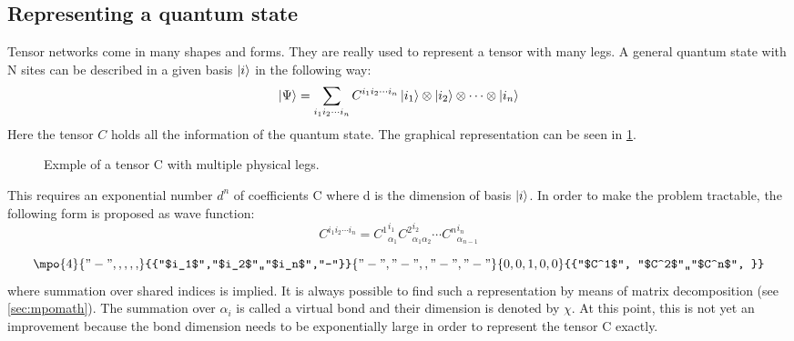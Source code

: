 \subsection{Representing a quantum state}

Tensor networks come in many shapes and forms. They are really used to represent a tensor with many legs. A general quantum state with N sites can be described in a given basis $\ket{i}$ in the following way:
\begin{equation}
    \ket{\Psi} = \sum_{i_1 i_2 \cdots i_n } C^{i_1 i_2 \cdots i_n} \ket{i_1} \otimes \ket{i_2} \otimes \cdots \otimes \ket{i_n}
\end{equation}
Here the tensor $C$ holds all the information of the quantum state. The graphical representation can be seen in \cref{fig:tens:intro:C}.
\begin{figure}[H]
    \centering


    \caption{Exmple of a tensor C with multiple physical legs.}
    \label{fig:tens:intro:C}
\end{figure}

This requires an exponential number $d^n$ of coefficients C where d is the dimension of basis $\ket{i}$. In order to make the problem tractable, the following form is proposed as wave function:
\begin{equation}
    C^{i_1 i_2 \cdots i_n} = {C^{1}}_{\alpha_1}^{ i_1} {C^{2}}_{\alpha_1 \alpha_2}^{i_2} \cdots  {C^{n}}_{\alpha_{n-1} }^{i_n}
\end{equation}

\begin{equation}
    \mpo{4}{{"-",,,,,}}{{"$i_1$","$i_2$",,"$i_n$","-"}}{{"-","-",,"-","-"}}{{0,0,1,0,0}}{{"$C^1$", "$C^2$",,"$C^n$", }}
\end{equation}
where summation over shared indices is implied. It is always possible to find such a representation by means of matrix decomposition (see \cref{sec:mpomath}). The summation over $\alpha_i$ is called a virtual bond and their dimension is denoted by $\chi$. At this point, this is not yet an improvement because the bond dimension needs to be exponentially large in order to represent the tensor C exactly.


